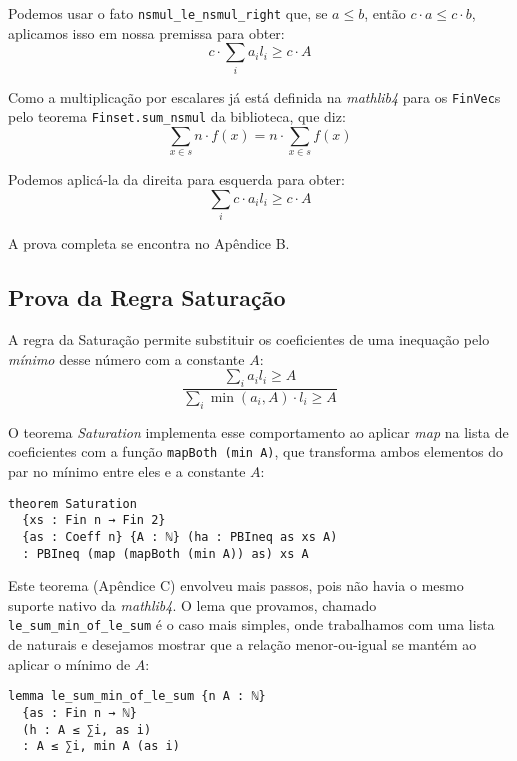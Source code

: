 \documentclass[conference]{IEEEtran}
\begin{document}
Podemos usar o fato \texttt{nsmul\_le\_nsmul\_right} que, se $a \le b$, então $c \cdot a \le c \cdot b$, aplicamos isso em nossa premissa para obter:
\begin{equation}
    c \cdot \sum_i{a_i l_i} \ge c \cdot A
\end{equation}

Como a multiplicação por escalares já está definida na \textit{mathlib4} para
os \texttt{FinVec}s pelo teorema \texttt{Finset.sum\_nsmul} da biblioteca,
que diz:
\begin{equation}
    \sum_{x \in s}{n \cdot f(x)} = n \cdot \sum_{x \in s}{f(x)}
\end{equation}

Podemos aplicá-la da direita para esquerda para obter:
\begin{equation}
    \sum_i{c \cdot a_i l_i} \ge c \cdot A
\end{equation}

A prova completa se encontra no Apêndice B.


\subsection{Prova da Regra Saturação}
A regra da Saturação permite substituir os coeficientes de uma inequação pelo \textit{mínimo} desse número com a constante $A$:
\begin{equation}
    \frac
    {\sum_i{a_i l_i} \ge A}
    {\sum_i{ \min(a_i,A)\cdot l_i} \ge A}
\end{equation}

O teorema \textit{Saturation} implementa esse comportamento ao aplicar \textit{map} na lista de coeficientes com a função
\texttt{mapBoth (min A)}, que transforma ambos elementos do par no mínimo entre eles e a constante $A$:
\begin{verbatim}
theorem Saturation
  {xs : Fin n → Fin 2}
  {as : Coeff n} {A : ℕ} (ha : PBIneq as xs A)
  : PBIneq (map (mapBoth (min A)) as) xs A
\end{verbatim}

Este teorema (Apêndice C) envolveu mais passos, pois não havia o mesmo suporte nativo da \textit{mathlib4}.
O lema que provamos, chamado \texttt{le\_sum\_min\_of\_le\_sum} é o caso mais simples, onde trabalhamos com uma
lista de naturais e desejamos mostrar que a relação menor-ou-igual se mantém ao aplicar o mínimo de $A$:
\begin{verbatim}
lemma le_sum_min_of_le_sum {n A : ℕ}
  {as : Fin n → ℕ}
  (h : A ≤ ∑i, as i)
  : A ≤ ∑i, min A (as i)
\end{verbatim}
\end{document}
